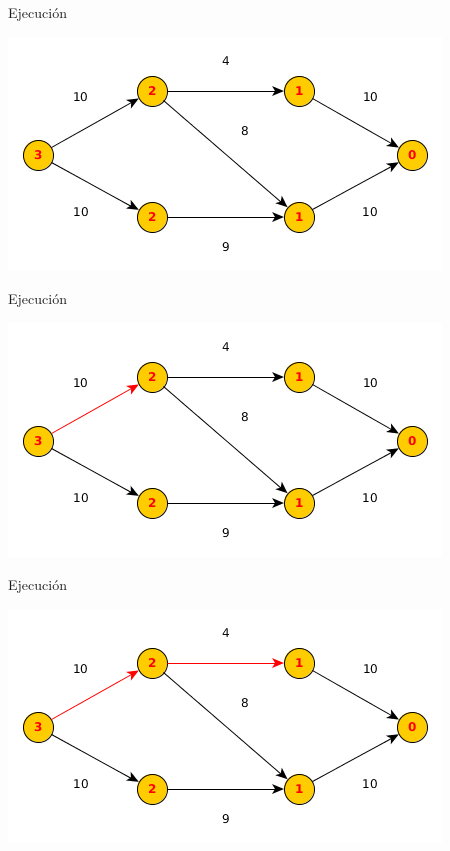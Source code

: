 \documentclass{beamer}
\begin{document}
\begin{frame}{Ejecución}

    
    \includegraphics[scale=0.6]{dinitz/dinitz3.png}
    
\end{frame}

\begin{frame}{Ejecución}

    
    \includegraphics[scale=0.6]{dinitz/dinitz4.png}
    
\end{frame}

\begin{frame}{Ejecución}

    
    \includegraphics[scale=0.6]{dinitz/dinitz5.png}
    
\end{frame}
\end{document}
